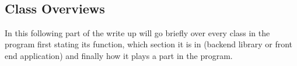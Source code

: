 \begin{flushleft}
\begin{enumerate}
    \begin{figure}[H]
        \centering
    \end{figure}\\

    \begin{figure}[H]
        \centering
    \end{figure}\\

    \\ \BK


    \\ \bk

    \subsection{Class Overviews}

    In this following part of the write up will go briefly over every class in the program first stating its function, which section it is in (backend library or front end application) and finally how it plays a part in the program.


\end{enumerate}
\end{flushleft}
